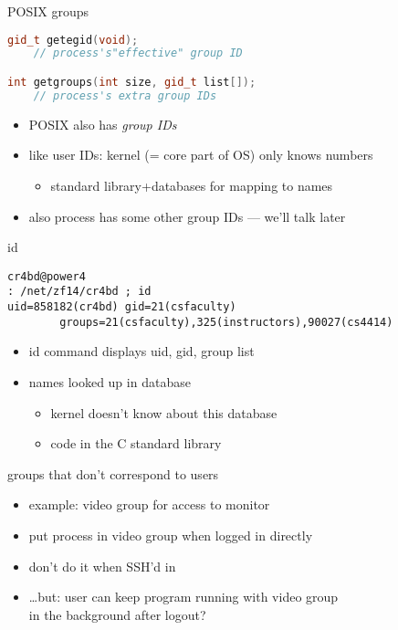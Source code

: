 \begin{frame}[fragile,label=posixGRoups]{POSIX groups}
\begin{lstlisting}[language=C++,style=small]
gid_t getegid(void);
    // process's"effective" group ID

int getgroups(int size, gid_t list[]);
    // process's extra group IDs
\end{lstlisting}
    \begin{itemize}
    \item POSIX also has \textit{group IDs}
    \item like user IDs: kernel (= core part of OS) only knows numbers
        \begin{itemize}
        \item standard library+databases for mapping to names
        \end{itemize}
    \item {\small also process has some other group IDs --- we'll talk later}
    \end{itemize}
\end{frame}

\begin{frame}[fragile,label=idCommand]{id}
\begin{lstlisting}[language={},style=small]
cr4bd@power4
: /net/zf14/cr4bd ; id
uid=858182(cr4bd) gid=21(csfaculty)
        groups=21(csfaculty),325(instructors),90027(cs4414)
\end{lstlisting}
\vspace{.5cm}
\begin{itemize}
\item id command displays uid, gid, group list
\item names looked up in database
    \begin{itemize}
    \item kernel doesn't know about this database
    \item code in the C standard library
    \end{itemize}
\end{itemize}
\end{frame}

\begin{frame}{groups that don't correspond to users}
    \begin{itemize}
    \item example: video group for access to monitor
    \vspace{.5cm}
    \item put process in video group when logged in directly
    \item don't do it when SSH'd in
    \vspace{.5cm}
    \item<2-> \ldots but: user can keep program running with video group \\ in the background after logout?
    \end{itemize}
\end{frame}
